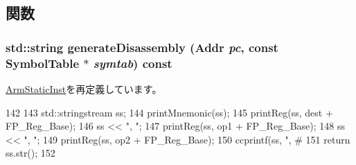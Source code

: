\subsection{関数}
\hypertarget{classArmISA_1_1FpRegRegRegImmOp_a95d323a22a5f07e14d6b4c9385a91896}{
\subsubsection[{generateDisassembly}]{\setlength{\rightskip}{0pt plus 5cm}std::string generateDisassembly ({\bf Addr} {\em pc}, \/  const SymbolTable $\ast$ {\em symtab}) const}}
\label{classArmISA_1_1FpRegRegRegImmOp_a95d323a22a5f07e14d6b4c9385a91896}


\hyperlink{classArmISA_1_1ArmStaticInst_a95d323a22a5f07e14d6b4c9385a91896}{ArmStaticInst}を再定義しています。


\begin{DoxyCode}
142 {
143     std::stringstream ss;
144     printMnemonic(ss);
145     printReg(ss, dest + FP_Reg_Base);
146     ss << ", ";
147     printReg(ss, op1 + FP_Reg_Base);
148     ss << ", ";
149     printReg(ss, op2 + FP_Reg_Base);
150     ccprintf(ss, ", #%
151     return ss.str();
152 }
\end{DoxyCode}


